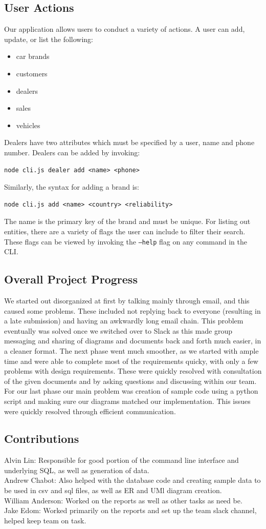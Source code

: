 \documentclass{math}
\begin{document}
\subsection*{User Actions}
Our application allows users to conduct a variety of actions. A user can add,
update, or list the following:
\begin{itemize}
  \item car brands
  \item customers
  \item dealers
  \item sales
  \item vehicles
\end{itemize}
Dealers have two attributes which must be specified by a user, name and phone
number. Dealers can be added by invoking:
\begin{lstlisting}
node cli.js dealer add <name> <phone>
\end{lstlisting}
Similarly, the syntax for adding a brand is:
\begin{lstlisting}
node cli.js add <name> <country> <reliability>
\end{lstlisting}
The name is the primary key of the brand and must be unique. For listing out
entities, there are a variety of flags the user can include to filter their
search. These flags can be viewed by invoking the \texttt{--help} flag on any
command in the CLI.

\subsection*{Overall Project Progress}
We started out disorganized at first by talking mainly through email, and this
caused some problems. These included not replying back to everyone (resulting
in a late submission) and having an awkwardly long email chain. This problem
eventually was solved once we switched over to Slack as this made group
messaging and sharing of diagrams and documents back and forth much easier, in
a cleaner format. The next phase went much smoother, as we started with ample
time and were able to complete most of the requirements quicky, with only a few
problems with design requirements. These were quickly resolved with
consultation of the given documents and by asking questions and discussing
within our team. For our last phase our main problem was creation of sample
code using a python script and making sure our diagrams matched our
implementation. This issues were quickly resolved through efficient
communication.

\subsection*{Contributions}
Alvin Lin: Responsible for good portion of the command line interface and
underlying SQL, as well as generation of data. \\
Andrew Chabot: Also helped with the database code and creating sample data to
be used in csv and sql files, as well as ER and UMl diagram creation. \\
William Anderson: Worked on the reports as well as other tasks as need be. \\
Jake Edom: Worked primarily on the reports and set up the team slack channel,
helped keep team on task.
\end{document}
